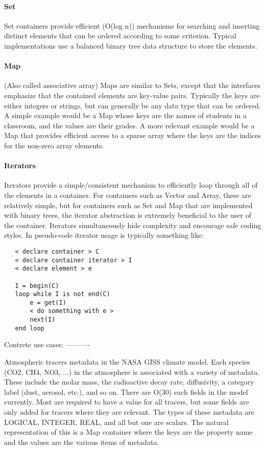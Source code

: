 \documentclass{article}
\begin{document}
\paragraph{Set} Set containers provide efficient (O(log n)) mechanisms for searching and inserting distinct elements that can be ordered according to some criterion.  Typical implementations use a balanced binary tree data structure to store the elements.

\paragraph{Map} (Also called associative array) Maps are similar to Sets, except that the interfaces emphasize that the contained elements are key-value pairs.  Typically the keys are either integers or strings, but can generally be any      data type that can be ordered.  A simple example would be a Map whose keys are the names of students in a classroom, and the values are their grades.  A more relevant example would be a Map that provides efficient access to a sparse array where the keys are the indices for the non-zero array elements.

\paragraph{Iterators}  Iterators provide a simple/consistent mechanism to efficiently loop through all of the elements in a container.  For   containers such as Vector and Array, these are relatively simple, but for containers such as Set and Map that are implemented with binary trees, the iterator abstraction is extremely beneficial to the user of the container.  Iterators simultaneously hide complexity and encourage safe coding styles.  In pseudo-code iterator
   usage is typically something like:

\begin{lstlisting}
   < declare container > C
   < declare container iterator > I
   < declare element > e

   I = begin(C)
   loop while I is not end(C)
       e = get(I)
       < do something with e >
       next(I)
   end loop
\end{lstlisting}    


Contrete use cases:
----------

Atmospheric tracers metadata in the NASA GISS climate model.  Each species (CO2, CH4, NO3, ...) in the atmosphere is associated with a variety of metadata.  These include the molar mass, the radioactive decay rate, diffusivity, a category label (dust, aerosol, etc.),   and so on.  There are O(30) such fields in the model currently.   Most are required to have a value for all tracers, but some fields   are only added for tracers where they are relevant.  The types of   these metadata are LOGICAL, INTEGER, REAL, and all but one are   scalars.  The natural representation of this is a Map container
   where the keys are the property name and the values are the various   items of metadata.
\end{document}
